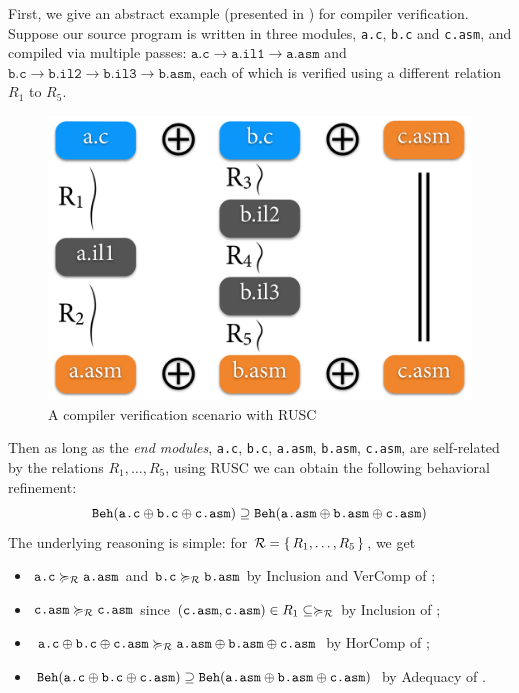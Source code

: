 First, we give an abstract example (presented in ) for compiler
verification.  Suppose our source program is written in three modules,
\texttt{a.c}, \texttt{b.c} and \texttt{c.asm}, and compiled via
multiple passes: $\texttt{a.c}\to\texttt{a.il1}\to\texttt{a.asm}$ and
$\texttt{b.c}\to\texttt{b.il2}\to\texttt{b.il3}\to\texttt{b.asm}$,
each of which is verified using a different relation $R_1$ to $R_5$.
\begin{figure}[t]
  \centering
  \includegraphics[width=0.90\linewidth]{images/fig-rusc.png}
  \caption{A compiler verification scenario with RUSC}
  \label{fig:rusc-verif-scenario}
\end{figure}
%
Then as long as the \emph{end modules}, \texttt{a.c}, \texttt{b.c}, \texttt{a.asm},
\texttt{b.asm}, \texttt{c.asm}, are self-related by the relations $R_1,\ldots,R_5$,
using RUSC we can obtain the following behavioral refinement:
\[
\mathtt{Beh}({\texttt{a.c} \oplus \texttt{b.c} \oplus \texttt{c.asm}}) \supseteq \mathtt{Beh}({\texttt{a.asm} \oplus \texttt{b.asm} \oplus \texttt{c.asm}})
\]
The underlying reasoning is simple: for $\mathcal{R}=\{\, R_1,\ldots,R_5 \,\}$, we get
\begin{itemize}
\item $\texttt{a.c} \succcurlyeq_{\mathcal{R}} \texttt{a.asm}$ and $\texttt{b.c} \succcurlyeq_{\mathcal{R}} \texttt{b.asm}$
  by Inclusion and VerComp of ;
\item $\texttt{c.asm} \succcurlyeq_{\mathcal{R}} \texttt{c.asm}$ since
  $(\texttt{c.asm},\texttt{c.asm}) \in R_1 \subseteq \succcurlyeq_{\mathcal{R}}$
  by Inclusion of ;
\item $\texttt{a.c} \oplus \texttt{b.c} \oplus \texttt{c.asm} \succcurlyeq_{\mathcal{R}} \texttt{a.asm} \oplus \texttt{b.asm} \oplus \texttt{c.asm}$
  by HorComp of ;
\item $\mathtt{Beh}({\texttt{a.c} \oplus \texttt{b.c} \oplus \texttt{c.asm}}) \supseteq \mathtt{Beh}({\texttt{a.asm} \oplus \texttt{b.asm} \oplus \texttt{c.asm}})$ by Adequacy of .
\end{itemize}

